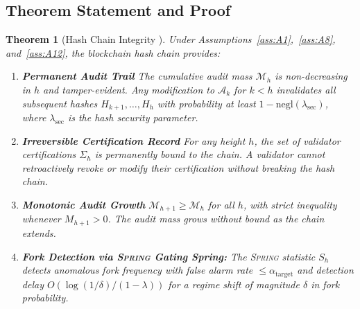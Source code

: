 \documentclass[11pt,a4paper]{article}
\newtheorem{theorem}{Theorem}[section]
\theoremstyle{definition}
\newcommand{\Spring}{\textsc{Spring}}
\begin{document}
\subsection{Theorem Statement and Proof}
\begin{theorem}[Hash Chain Integrity ]
\label{thm:hashchain}
Under Assumptions~\ref{ass:A1},~\ref{ass:A8}, and~\ref{ass:A12}, the blockchain hash chain provides:
\begin{enumerate}[label=(\roman*)]
    \item \textbf{Permanent Audit Trail} The cumulative audit mass $\mathcal{M}_h$ is non-decreasing in $h$ and tamper-evident. Any modification to $\mathcal{A}_k$ for $k < h$ invalidates all subsequent hashes $H_{k+1}, \ldots, H_h$ with probability at least $1 - \mathrm{negl}(\lambda_{\mathrm{sec}})$, where $\lambda_{\mathrm{sec}}$ is the hash security parameter.
    \item \textbf{Irreversible Certification Record} For any height $h$, the set of validator certifications $\Sigma_h$ is permanently bound to the chain. A validator cannot retroactively revoke or modify their certification without breaking the hash chain.
    \item \textbf{Monotonic Audit Growth} $\mathcal{M}_{h+1} \geq \mathcal{M}_h$ for all $h$, with strict inequality whenever $M_{h+1} > 0$. The audit mass grows without bound as the chain extends.
    \item \textbf{Fork Detection via \Spring{} Gating Spring:} The \Spring{} statistic $S_h$ detects anomalous fork frequency with false alarm rate $\leq \alpha_{\mathrm{target}}$ and detection delay $O(\log(1/\delta) / (1-\lambda))$ for a regime shift of magnitude $\delta$ in fork probability.
\end{enumerate}
\end{theorem}
\end{document}
